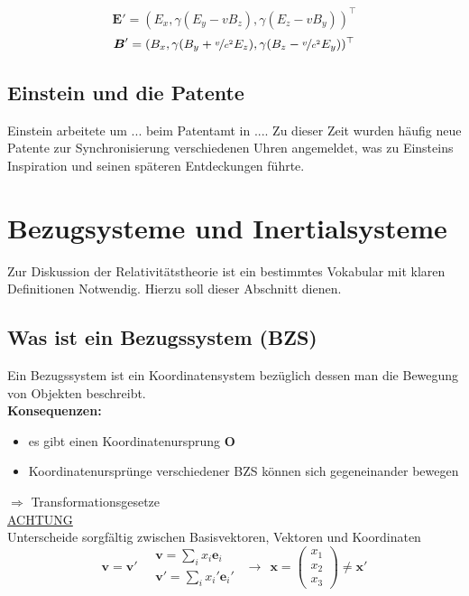 \documentclass[titlepage,11pt,a4paper,ngerman]{report}
\renewcommand{\vec}[1]{\boldsymbol{#1}}
\begin{document}
$$\vec{E}'=(E_x,\gamma(E_y-vB_z),\gamma(E_z-vB_y))^\top$$
$$\vec{B}'=(B_x,\gamma(B_y+\nicefrac{v}{c^2}E_z),\gamma(B_z-\nicefrac{v}{c^2}E_y))^\top$$

\subsection{Einstein und die Patente}






Einstein arbeitete um ... beim Patentamt in .... Zu dieser Zeit wurden häufig neue Patente zur Synchronisierung verschiedenen Uhren angemeldet, was zu Einsteins Inspiration und seinen späteren Entdeckungen führte.

\section{Bezugsysteme und Inertialsysteme}
Zur Diskussion der Relativitätstheorie ist ein bestimmtes Vokabular mit klaren Definitionen Notwendig. Hierzu soll dieser Abschnitt dienen.

\subsection{Was ist ein Bezugssystem (BZS)}

Ein Bezugssystem ist ein Koordinatensystem bezüglich dessen man die Bewegung von Objekten beschreibt.\\
\textbf{Konsequenzen:}
\begin{itemize}
	\item es gibt einen Koordinatenursprung $ \vec{O} $
	\item Koordinatenursprünge verschiedener BZS können sich gegeneinander bewegen
\end{itemize}
$ \Rightarrow $ Transformationsgesetze\\[5pt]
\underline{ACHTUNG}\\
Unterscheide sorgfältig zwischen Basisvektoren, Vektoren und Koordinaten
\begin{equation*}
\vec{v} = \vec{v}' \quad \begin{array}{c}
\vec{v} = \sum_i x_i \vec{e}_i \\ \vec{v}' = \sum_i x_i' \vec{e}_i'
\end{array} \ \ \rightarrow \ \ \vec{x} = \begin{pmatrix}
x_1 \\ x_2 \\ x_3
\end{pmatrix} \neq \vec{x}'
\end{equation*}
\end{document}
